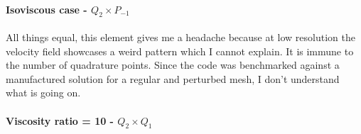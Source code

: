 \newpage
\paragraph{Isoviscous case - $Q_2\times P_{-1}$}

All things equal, this element gives me a headache because at low resolution the velocity
field showcases a weird pattern which I cannot explain. It is immune to the number of quadrature points. 
Since the code was benchmarked against a manufactured solution for a regular and perturbed 
mesh, I don't understand what is going on.










\newpage
\paragraph{Viscosity ratio = 10 - $Q_2\times Q_1$}

